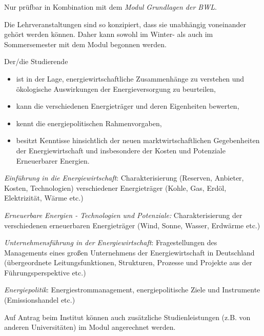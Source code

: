 \begin{module}
\begin{styleenv}
\begin{assessment}
\end{assessment}

\begin{conditions}Nur prüfbar in Kombination mit dem \emph{Modul Grundlagen der BWL}.

 \end{conditions}

\begin{recommendations}Die Lehrveranstaltungen sind so konzipiert, dass sie unabhängig voneinander gehört werden können. Daher kann sowohl im Winter- als auch im Sommersemester mit dem Modul begonnen werden.

\end{recommendations}
\end{styleenv}

\begin{learningoutcomes}
Der/die Studierende

 \begin{itemize}\item ist in der Lage, energiewirtschaftliche Zusammenhänge zu verstehen und ökologische Auswirkungen der Energieversorgung zu beurteilen,  \item kann die verschiedenen Energieträger und deren Eigenheiten bewerten,  \item kennt die energiepolitischen Rahmenvorgaben,  \item besitzt Kenntisse hinsichtlich der neuen marktwirtschaftlichen Gegebenheiten der Energiewirtschaft und insbesondere der Kosten und Potenziale Erneuerbarer Energien.  \end{itemize}
\end{learningoutcomes}

\begin{content}
\emph{Einführung in die Energiewirtschaft}: Charakterisierung (Reserven, Anbieter, Kosten, Technologien) verschiedener Energieträger (Kohle, Gas, Erdöl, Elektrizität, Wärme etc.)

 

\emph{Erneuerbare Energien - Technologien und Potenziale:} Charakterisierung der verschiedenen erneuerbaren Energieträger (Wind, Sonne, Wasser, Erdwärme etc.)

 

\emph{Unternehmensführung in der Energiewirtschaft}: Fragestellungen des Managements eines großen Unternehmens der Energiewirtschaft in Deutschland (übergeordnete Leitungsfunktionen, Strukturen, Prozesse und Projekte aus der Führungsperspektive etc.)

 

\emph{Energiepolitik}: Energiestrommanagement, energiepolitische Ziele und Instrumente (Emissionshandel etc.)


\end{content}

\begin{remarks}Auf Antrag beim Institut können auch zusätzliche Studienleistungen (z.B. von anderen Universitäten) im Modul angerechnet werden.

\end{remarks}

\end{module}

